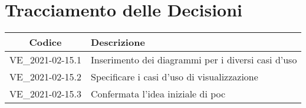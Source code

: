 \section*{Tracciamento delle Decisioni}

\begin{center}
	\begin{longtable}{|c|p{11.5cm}|}
	\hline
	\rowcolor{lighter-grayer}
	\textbf{Codice} & \textbf{Descrizione} \\
	\hline
	\endfirsthead

	\hline
	VE\_2021-02-15.1 & Inserimento dei diagrammi per i diversi casi d'uso \\
	VE\_2021-02-15.2 & Specificare i casi d'uso di visualizzazione \\
	VE\_2021-02-15.3 & Confermata l'idea iniziale di poc \\
	\hline

	\end{longtable}
\end{center}